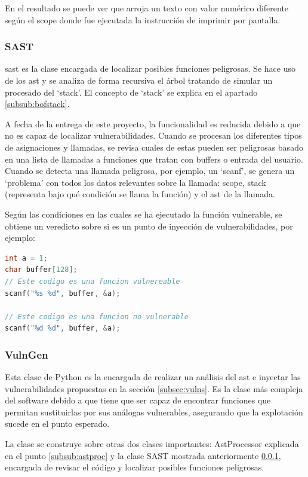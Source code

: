 En el resultado se puede ver que arroja un texto con valor numérico diferente según el scope donde fue ejecutada la instrucción de imprimir por pantalla.

\subsubsection{SAST} \label{subsub:sast}
\acrshort{sast} es la clase encargada de localizar posibles funciones peligrosas.
Se hace uso de los \acrshort{ast} y se analiza de forma recursiva el árbol tratando de simular un procesado del `stack'.
El concepto de `stack' se explica en el apartado \ref{subsub:bofstack}.

A fecha de la entrega de este proyecto, la funcionalidad es reducida debido a que no es capaz de localizar vulnerabilidades.
Cuando se procesan los diferentes tipos de asignaciones y llamadas, se revisa cuales de estas pueden ser peligrosas basado en una lista de llamadas a funciones que tratan con buffers o entrada del usuario.
Cuando se detecta una llamada peligrosa, por ejemplo, un `scanf', se genera un `problema' con todos los datos relevantes sobre la llamada: scope, stack (representa bajo qué condición se llama la función) y el \acrshort{ast} de la llamada.

Según las condiciones en las cuales se ha ejecutado la función vulnerable, se obtiene un veredicto sobre si es un punto de inyección de vulnerabilidades, por ejemplo:

\begin{lstlisting}[language=C, caption=Funciones peligrosas]
int a = 1;
char buffer[128];
// Este codigo es una funcion vulnereable
scanf("%s %d", buffer, &a);

// Este codigo es una funcion no vulnerable
scanf("%d %d", buffer, &a);
\end{lstlisting}

\subsubsection{VulnGen}
Esta clase de Python es la encargada de realizar un análisis del \acrshort{ast} e inyectar las vulnerabilidades propuestas en la sección \ref{subsec:vulns}. Es la clase más compleja del software debido a que tiene que ser capaz de encontrar funciones que permitan sustituirlas por sus análogas vulnerables, asegurando que la explotación sucede en el punto esperado.

La clase se construye sobre otras dos clases importantes: AstProcessor explicada en el punto \ref{subsub:astproc} y la clase SAST mostrada anteriormente \ref{subsub:sast}, encargada de revisar el código y localizar posibles funciones peligrosas.

